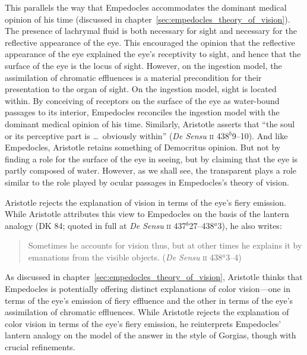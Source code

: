 This parallels the way that Empedocles accommodates the dominant medical opinion of his time (discussed in chapter~\ref{sec:empedocles_theory_of_vision}). The presence of lachrymal fluid is both necessary for sight and necessary for the reflective appearance of the eye. This encouraged the opinion that the reflective appearance of the eye explained the eye's receptivity to sight, and hence that the surface of the eye is the locus of sight. However, on the ingestion model, the assimilation of chromatic effluences is a material precondition for their presentation to the organ of sight. On the ingestion model, sight is located within. By conceiving of receptors on the surface of the eye as water-bound passages to its interior, Empedocles reconciles the ingestion model with the dominant medical opinion of his time. Similarly, Aristotle asserts that ``the soul or its perceptive part is \ldots\ obviously within'' (\emph{De Sensu} \textsc{ii} 438\( ^{b} \)9--10). And like Empedocles, Aristotle retains something of Democritus opinion. But not by finding a role for the surface of the eye in seeing, but by claiming that the eye is partly composed of water. However, as we shall see, the transparent plays a role similar to the role played by ocular passages in Empedocles's theory of vision.

Aristotle rejects the explanation of vision in terms of the eye's fiery emission. While Aristotle attributes this view to Empedocles on the basis of the lantern analogy (DK 84; quoted in full at \emph{De Sensu} \textsc{ii} 437\( ^{b} \)27--438\( ^{a} \)3), he also writes:
\begin{quote}
	Sometimes he accounts for vision thus, but at other times he explains it by emanations from the visible objects. (\emph{De Sensu} \textsc{ii} 438\( ^{a} \)3--4)
\end{quote}
As discussed in chapter~\ref{sec:empedocles_theory_of_vision}, Aristotle thinks that Empedocles is potentially offering distinct explanations of color vision---one in terms of the eye's emission of fiery effluence and the other in terms of the eye's assimilation of chromatic effluences. While Aristotle rejects the explanation of color vision in terms of the eye's fiery emission, he reinterprets Empedocles' lantern analogy on the model of the answer in the style of Gorgias, though with crucial refinements.

